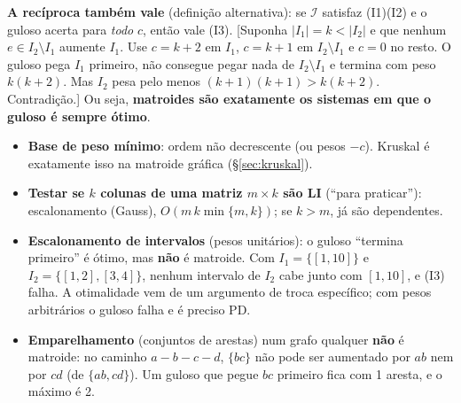 \textbf{A recíproca também vale} (definição alternativa): se $\mathcal I$ satisfaz (I1)(I2) e o guloso acerta para \emph{todo} $c$, então vale (I3). [Suponha $|I_1|=k<|I_2|$ e que nenhum $e\in I_2\setminus I_1$ aumente $I_1$. Use $c=k+2$ em $I_1$, $c=k+1$ em $I_2\setminus I_1$ e $c=0$ no resto. O guloso pega $I_1$ primeiro, não consegue pegar nada de $I_2\setminus I_1$ e termina com peso $k(k+2)$. Mas $I_2$ pesa pelo menos $(k+1)(k+1)>k(k+2)$. Contradição.] Ou seja, \textbf{matroides são exatamente os sistemas em que o guloso é sempre ótimo}.
\begin{itemize}
  \item \textbf{Base de peso mínimo}: ordem não decrescente (ou pesos $-c$). Kruskal é exatamente isso na matroide gráfica (§\ref{sec:kruskal}).
  \item \textbf{Testar se $k$ colunas de uma matriz $m\times k$ são LI} (``para praticar''): escalonamento (Gauss), $O(m\,k\min\{m,k\})$; se $k>m$, já são dependentes.
  \item \textbf{Escalonamento de intervalos} (pesos unitários): o guloso ``termina primeiro'' é ótimo, mas \textbf{não} é matroide. Com $I_1=\{[1,10]\}$ e $I_2=\{[1,2],[3,4]\}$, nenhum intervalo de $I_2$ cabe junto com $[1,10]$, e (I3) falha. A otimalidade vem de um argumento de troca específico; com pesos arbitrários o guloso falha e é preciso PD.
  \item \textbf{Emparelhamento} (conjuntos de arestas) num grafo qualquer \textbf{não} é matroide: no caminho $a\!-\!b\!-\!c\!-\!d$, $\{bc\}$ não pode ser aumentado por $ab$ nem por $cd$ (de $\{ab,cd\}$). Um guloso que pegue $bc$ primeiro fica com 1 aresta, e o máximo é 2.
\end{itemize}

